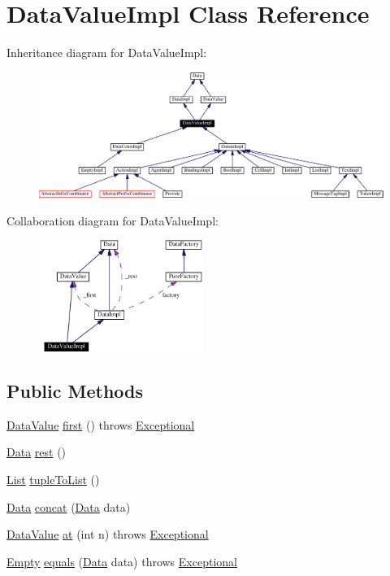 \hypertarget{classDataValueImpl}{
\section{Data\-Value\-Impl  Class Reference}
\label{classDataValueImpl}
}
Inheritance diagram for Data\-Value\-Impl:\begin{figure}[H]
\begin{center}
\leavevmode
\includegraphics[width=381pt]{classDataValueImpl__inherit__graph}
\end{center}
\end{figure}
Collaboration diagram for Data\-Value\-Impl:\begin{figure}[H]
\begin{center}
\leavevmode
\includegraphics[width=151pt]{classDataValueImpl__coll__graph}
\end{center}
\end{figure}
\subsection*{Public Methods}
\begin{CompactItemize}
\item 
\hyperlink{interfaceDataValue}{Data\-Value} \hyperlink{classDataValueImpl_a0}{first} () throws \hyperlink{classExceptional}{Exceptional}
\item 
\hyperlink{interfaceData}{Data} \hyperlink{classDataValueImpl_a1}{rest} ()
\item 
\hyperlink{interfaceList}{List} \hyperlink{classDataValueImpl_a2}{tuple\-To\-List} ()
\item 
\hyperlink{interfaceData}{Data} \hyperlink{classDataValueImpl_a3}{concat} (\hyperlink{interfaceData}{Data} data)
\item 
\hyperlink{interfaceDataValue}{Data\-Value} \hyperlink{classDataValueImpl_a4}{at} (int n) throws \hyperlink{classExceptional}{Exceptional}
\item 
\hyperlink{interfaceEmpty}{Empty} \hyperlink{classDataValueImpl_a5}{equals} (\hyperlink{interfaceData}{Data} data) throws \hyperlink{classExceptional}{Exceptional}
\end{CompactItemize}
